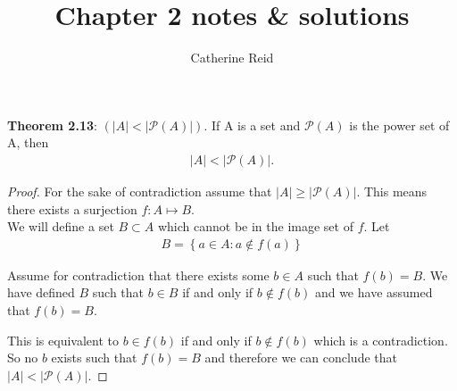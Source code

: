 \documentclass{article}
\author{Catherine Reid}
\title{Chapter 2 notes \& solutions}
\date{}
\begin{document}
\maketitle

\textbf{Theorem 2.13}: $(|A| < | \mathcal{P}(A)|)$. If A is a set and $\mathcal{P}(A)$ is the power set of A, then
\begin{align*}
	|A| < | \mathcal{P}(A)|.
\end{align*}

\begin{proof}
For the sake of contradiction assume that $|A| \geq | \mathcal{P}(A)|$. This means there exists a surjection $f: A \mapsto B$.\\

We will define a set $B \subset A$ which cannot be in the image set of $f$. Let 
\begin{align*}
	B = \left\{a \in A: a \notin f(a) \right\}
\end{align*}

Assume for contradiction that there exists some $b \in A$ such that $f(b) = B$. We have defined $B$ such that $b \in B$ if and only if $b \notin f(b)$ and we have assumed that $f(b) = B$.

This is equivalent to $b \in f(b)$ if and only if $b \notin f(b)$ which is a contradiction.
So no $b$ exists such that $f(b) = B$ and therefore we can conclude that $|A| < | \mathcal{P}(A)|$.

\end{proof}
\end{document}
